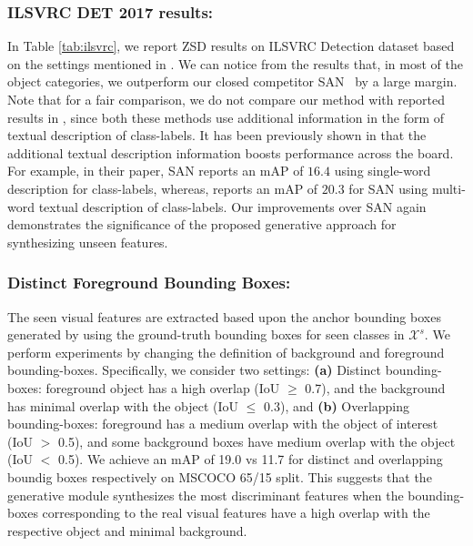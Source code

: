 \documentclass[runningheads]{llncs}
\begin{document}
\subsubsection{ILSVRC DET 2017 results:} In Table \ref{tab:ilsvrc}, we report ZSD results on ILSVRC Detection dataset based on the settings mentioned in \cite{rahman2018zero}. We can notice from the results that, in most of the object categories, we outperform our closed competitor SAN~\cite{rahman2018zero} by a large margin. Note that for a fair comparison, we do not compare our method with reported results in \cite{li2019zero,zhao2020gtnet}, since both these methods use additional information in the form of textual description of class-labels. It has been previously shown in \cite{li2019zero} that the additional textual description information boosts performance across the board. For example, in their paper, SAN \cite{rahman2018zero} reports an mAP of $16.4$ using single-word description for class-labels, whereas, \cite{li2019zero} reports an mAP of $20.3$ for SAN using multi-word textual description of class-labels. Our improvements over SAN again demonstrates the significance of the proposed generative approach for synthesizing unseen features.







\subsubsection{Distinct Foreground Bounding Boxes:} The seen visual features are extracted based upon the anchor bounding boxes generated by using the ground-truth bounding boxes for seen classes in $\mathcal{X}^s$. We perform experiments by changing the definition of background and foreground bounding-boxes. Specifically, we consider two settings: \textbf{(a) }Distinct bounding-boxes: foreground object has a high overlap (IoU $\ge$ 0.7), and the background has minimal overlap with the object (IoU $\le$ 0.3), and  \textbf{(b)} Overlapping bounding-boxes: foreground has a medium overlap with the object of interest (IoU $>$ 0.5), and some background boxes have medium overlap with the object (IoU $<$ 0.5). We achieve an mAP of 19.0 vs 11.7 for distinct and overlapping boundig boxes respectively  on MSCOCO 65/15 split. This suggests that the generative module synthesizes the most discriminant features when the bounding-boxes corresponding to the real visual features have a high overlap with the respective object and minimal background.   
\end{document}
